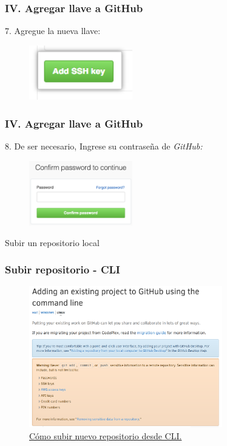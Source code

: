 \documentclass{beamer}
\begin{document}
\begin{frame}[fragile]
  \frametitle{IV. Agregar llave a GitHub}
  7. Agregue la nueva llave:
  \begin{figure}[hp]
    \centering \includegraphics[width=0.4\textwidth]{fig/ssh-add-key}
    \label{fig:gssh05}
  \end{figure}
\end{frame}

\begin{frame}[fragile]
  \frametitle{IV. Agregar llave a GitHub}
  8. De ser necesario, Ingrese su contrase\~na de \textit{GitHub:}
  \begin{figure}[hp]
    \centering \includegraphics[width=0.4\textwidth]{fig/sudo_mode_popup}
    \label{fig:gssh06}
  \end{figure}
\end{frame}

\begin{frame}[standout]
  Subir un repositorio local
\end{frame}

\begin{frame}[fragile]
  \frametitle{Subir repositorio - CLI}
  \begin{figure}[hp]
    \centering \includegraphics[width=0.75\textwidth]{fig/new-project-cli}
    \caption{\href{https://help.github.com/articles/adding-an-existing-project-to-github-using-the-command-line/}%
      {C\'omo subir nuevo repositorio desde CLI.}}
    \label{fig:ghcli}
  \end{figure}
\end{frame}
\end{document}
